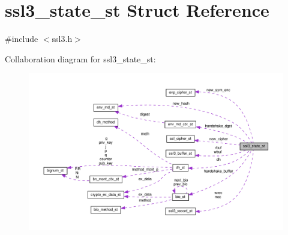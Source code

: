 \hypertarget{structssl3__state__st}{}\section{ssl3\+\_\+state\+\_\+st Struct Reference}
\label{structssl3__state__st}


{\ttfamily \#include $<$ssl3.\+h$>$}



Collaboration diagram for ssl3\+\_\+state\+\_\+st\+:
\nopagebreak
\begin{figure}[H]
\begin{center}
\leavevmode
\includegraphics[width=350pt]{structssl3__state__st__coll__graph}
\end{center}
\end{figure}
